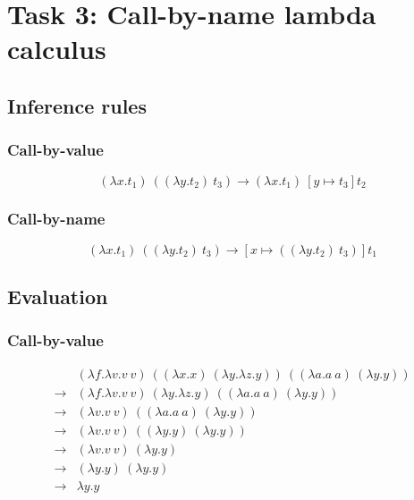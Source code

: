 \documentclass[13pt, a4paper]{article}
\begin{document}
\section*{Task 3: Call-by-name lambda calculus}

\subsection*{Inference rules} %

\subsubsection*{Call-by-value}
\[
(\lambda x.t_1)\ ((\lambda y.t_2)\ t_3) \to (\lambda x.t_1)\ [y \mapsto t_3]t_2
\]

\subsubsection*{Call-by-name}
\[
(\lambda x.t_1)\ ((\lambda y.t_2)\ t_3) \to [x \mapsto ((\lambda y.t_2)\ t_3)]t_1
\]

\subsection*{Evaluation} %

\subsubsection*{Call-by-value}
\[
\begin{array}{llr}
& (\lambda f.\lambda v. v\ v)\ ((\lambda x.x)\ (\lambda y.\lambda z.y))\ ((\lambda a.a\ a)\ (\lambda y.y)) \\
\to & (\lambda f.\lambda v. v\ v)\ (\lambda y.\lambda z.y)\ ((\lambda a.a\ a)\ (\lambda y.y)) \\
\to & (\lambda v. v\ v)\ ((\lambda a.a\ a)\ (\lambda y.y)) \\
\to & (\lambda v. v\ v)\ ((\lambda y.y)\ (\lambda y.y)) \\
\to & (\lambda v. v\ v)\ (\lambda y.y) \\
\to & (\lambda y.y)\ (\lambda y.y) \\
\to & \lambda y.y \\
\end{array}
\]
\end{document}
